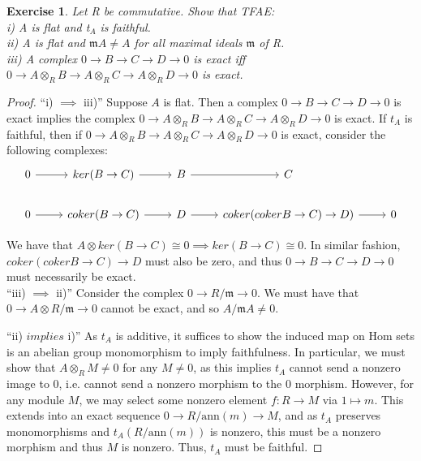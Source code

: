 \documentclass{article}
\newcommand{\Hom}{\text{Hom}}
\newcommand{\fk}[1]{\mathfrak{#1}}
\newtheorem{exercise}{Exercise}
\begin{document}
\begin{exercise}
  Let R be commutative. Show that TFAE: \\
  i) A is flat and t$_{A}$ is faithful. \\
  ii) A is flat and $\fk{m}A \neq A$ for all maximal ideals $\fk{m}$ of R. \\
  iii) A complex $0 \to B \to C \to D \to 0 $ is exact iff $0 \to A \otimes_{R} B \to A \otimes_{R} C \to A \otimes_{R} D \to 0$ is exact. 
\end{exercise}
\begin{proof}
  ``i) $\implies$ iii)'' Suppose $A$ is flat. Then a complex $0 \to B \to C \to D \to 0 $ is exact implies the complex $0 \to A \otimes_{R} B \to A \otimes_{R} C \to A \otimes_{R} D \to 0$ is exact. If $t_{A}$ is faithful, then if $0 \to A \otimes_{R} B \to A \otimes_{R} C \to A \otimes_{R} D \to 0$ is exact, consider the following complexes:
  \[
    \begin{tikzcd}
0 \arrow[r] & ker(B \to C) \arrow[r]    & B \arrow[r] & C                                    &   \\
0 \arrow[r] & coker (B \to C) \arrow[r] & D \arrow[r] & coker(cokerB \to C) \to D) \arrow[r] & 0
\end{tikzcd}
\]

We have that $A \otimes ker(B \to C) \cong 0 \implies ker (B \to C) \cong 0$. In similar fashion, $coker(cokerB \to C) \to D$ must also be zero, and thus $0 \to B \to C \to D \to 0$ must necessarily be exact. \\

``iii) $\implies$ ii)'' Consider the complex $0 \to R/\fk{m} \to 0$. We must have that $0 \to A \otimes R/\fk{m} \to 0$ cannot be exact, and so $A/\fk{m}A \neq 0$. 

``ii) $implies$ i)'' As $t_{A}$ is additive, it suffices to show the induced map on $\Hom$ sets is an abelian group monomorphism to imply faithfulness. In particular, we must show that $A \otimes_{R} M \neq 0$ for any $M \neq 0$, as this implies $t_{A}$ cannot send a nonzero image to 0, i.e. cannot send a nonzero morphism to the $0$ morphism. However, for any module $M$, we may select some nonzero element $f: R \to M$ via $1 \mapsto m$. This extends into an exact sequence $0 \to R/\text{ann}(m) \to M$, and as $t_{A}$ preserves monomorphisms and $t_{A}(R/\text{ann}(m))$ is nonzero, this must be a nonzero morphism and thus $M$ is nonzero. Thus, $t_{A}$ must be faithful.     
\end{proof}
\end{document}
